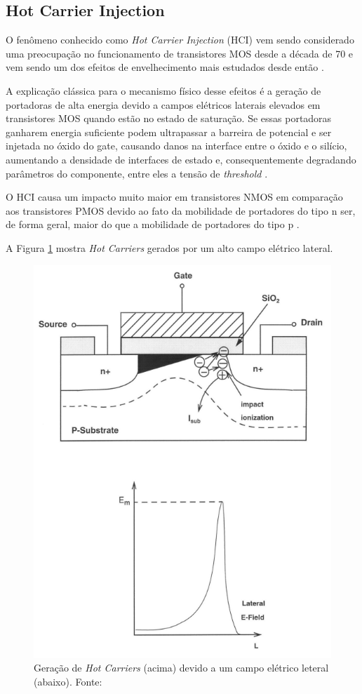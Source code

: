 \subsection{Hot Carrier Injection}

O fenômeno conhecido como \textit{Hot Carrier Injection} (HCI) vem sendo considerado uma preocupação no funcionamento de transistores MOS desde a década de 70 e vem sendo um dos efeitos de envelhecimento mais estudados desde então \cite{Butzen}.

A explicação clássica para o mecanismo físico desse efeitos é a geração de portadoras de alta energia devido a campos elétricos laterais elevados em transistores MOS quando estão no estado de saturação. Se essas portadoras ganharem energia suficiente podem ultrapassar a barreira de potencial e ser injetada no óxido do gate, causando danos na interface entre o óxido e o silício, aumentando a densidade de interfaces de estado e, consequentemente degradando parâmetros do componente, entre eles a tensão de \textit{threshold} \cite{Cacho}.

O HCI causa um impacto muito maior em transistores NMOS em comparação aos transistores PMOS devido ao fato da mobilidade de portadores do tipo n ser, de forma geral, maior do que a mobilidade de portadores do tipo p \cite{Jiang}.

A Figura \ref{fig:hci} mostra \textit{Hot Carriers} gerados por um alto campo elétrico lateral.

\begin{figure}[H]
    \centering
    \includegraphics[scale=0.5]{figures/ReferencialTeorico/HCI.png}
    \caption{Geração de \textit{Hot Carriers} (acima) devido a um campo elétrico leteral (abaixo). Fonte: \cite{Jiang}}
    \label{fig:hci}
\end{figure}

